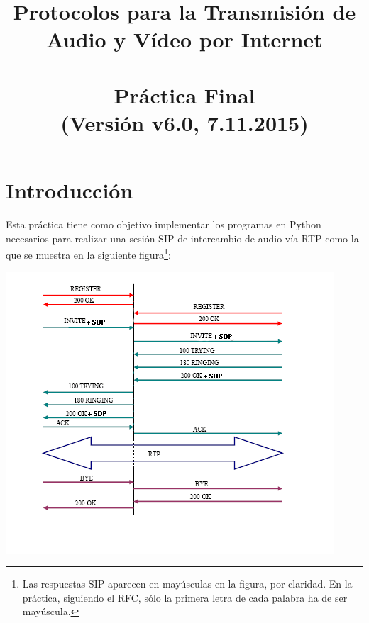 \documentclass[a4paper,11pt]{article}
\begin{document}
\title{Protocolos para la Transmisión de Audio y Vídeo por Internet\\ 
\ \\ 
Práctica Final \\
(Versión v6.0, 7.11.2015) %
}

\maketitle
\thispagestyle{empty}
\tableofcontents
\newpage


\section{Introducción}

Esta práctica tiene como objetivo implementar los programas en Python 
necesarios para realizar una sesión SIP de intercambio de audio vía RTP
como la que se muestra en la siguiente figura\footnote{Las respuestas SIP
aparecen en mayúsculas en la figura, por claridad. En la práctica, siguiendo
el RFC, sólo la primera letra de cada palabra ha de ser mayúscula.}:

\begin{center}
\includegraphics{figs/complete-sip-session.png}
\end{center}
\end{document}
